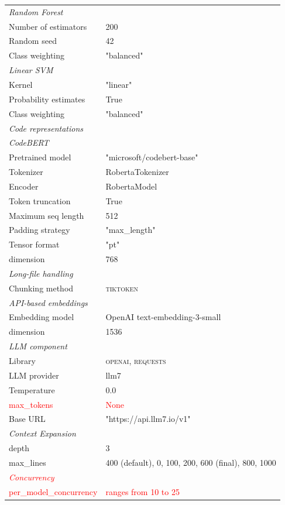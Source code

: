 \documentclass[authoryear,final,5p,times,twocolumn]{elsarticle}
\theoremstyle{plain}
\begin{document}
\begin{table}[!htbp]
{\begin{tabularx}{\columnwidth}{lX}
\quad \textit{Random Forest} & \\
\qquad Number of estimators & 200 \\
\qquad Random seed & 42 \\
\qquad Class weighting & "balanced" \\

\quad \textit{Linear SVM} & \\
\qquad Kernel & "linear" \\
\qquad Probability estimates & True \\
\qquad Class weighting & "balanced" \\

\midrule
\textit{Code representations} & \\

\quad \textit{CodeBERT} & \\
\qquad Pretrained model & "microsoft/codebert-base" \\
\qquad Tokenizer & RobertaTokenizer \\
\qquad Encoder & RobertaModel \\
\qquad Token truncation & True \\
\qquad Maximum seq length & 512 \\
\qquad Padding strategy & "max\_length" \\
\qquad Tensor format & "pt" \\
\qquad dimension & 768 \\

\quad \textit{Long-file handling} & \\
\qquad Chunking method & \textsc{tiktoken} \\

\quad \textit{API-based embeddings} & \\
\qquad Embedding model & OpenAI text-embedding-3-small \\
\qquad dimension & 1536 \\

\midrule
\textit{LLM component} & \\
\quad Library & \textsc{openai}, \textsc{requests} \\
\quad LLM provider & llm7\footnotemark \\
\quad Temperature & 0.0 \\
\quad \textcolor{red}{max\_tokens} & \textcolor{red}{None} \\
\quad Base URL & "https://api.llm7.io/v1"\\

\midrule
\textit{Context Expansion} & \\

\quad depth & 3 \\
\quad max\_lines & 400 (default), 0, 100, 200, 600 (final), 800, 1000 \\

\midrule
\textit{\textcolor{red}{Concurrency}} & \\
\quad \textcolor{red}{per\_model\_concurrency} & \textcolor{red}{ranges from 10 to 25} \\

\bottomrule
\end{tabularx}
}
\end{table}
\end{document}
